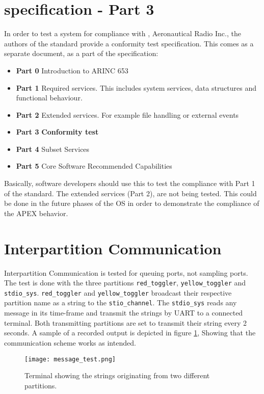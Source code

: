 \section{\arinc{} specification - Part 3}
In order to test a system for compliance with \arinc{}, Aeronautical
Radio Inc., the authors of the standard provide a conformity test
specification. This comes as a separate document, as a part of the
\arinc{} specification:
\begin{itemize}
	\item\textbf{Part 0} Introduction to ARINC 653
	\item\textbf{Part 1} Required services. This includes system services,
	data structures and functional behaviour.
	\item\textbf{Part 2} Extended services. For example file handling or external events
	\item\textbf{Part 3} \textbf{Conformity test}
	\item\textbf{Part 4} Subset Services
	\item\textbf{Part 5} Core Software Recommended Capabilities
\end{itemize}

Basically, software developers should use this to test the compliance with
Part 1 of the standard. The extended services (Part 2), are not being
tested. This could be done in the future phases of the \OSname{} OS in order
to demonstrate the compliance of the APEX behavior.

\section{Interpartition Communication}
Interpartition Communication is tested for queuing ports, not sampling ports.
The test is done with the three partitions \texttt{red\_toggler},
\texttt{yellow\_toggler} and \texttt{stdio\_sys}. \texttt{red\_toggler} and
\texttt{yellow\_toggler} broadcast their respective partition name as a string
to the \texttt{stio\_channel}. The \texttt{stdio\_sys} reads any message in its
time-frame and transmit the strings by UART to a connected terminal. Both
transmitting partitions are set to transmit their string every 2 seconds. A
sample of a recorded output is depicted in figure \ref{fig:message_test},
Showing that the communication scheme works as intended.

\begin{figure}[H]
	\centering
	\texttt{[image: message\_test.png]}
	\caption{Terminal showing the strings originating from two different
		partitions.}
	\label{fig:message_test}
\end{figure}

